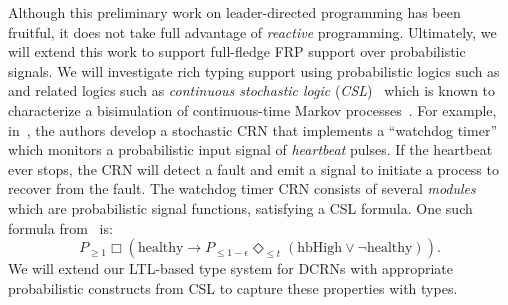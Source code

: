 Although this preliminary work on leader-directed programming has been fruitful, it does not take full advantage of \emph{reactive} programming.
Ultimately, we will extend this work to support full-fledge FRP support over probabilistic signals.
We will investigate rich typing support using probabilistic logics such as and related logics such as \emph{continuous stochastic logic} (\emph{CSL})~\cite{cASSB96} which is known to characterize a bisimulation of continuous-time Markov processes~\cite{DESHARNAIS200399}.
For example, in~\cite{jEKLLLM17}, the authors develop a stochastic CRN that implements a ``watchdog timer'' which monitors a probabilistic input signal of \emph{heartbeat} pulses.
If the heartbeat ever stops, the CRN will detect a fault and emit a signal to initiate a process to recover from the fault.
The watchdog timer CRN consists of several \emph{modules} which are probabilistic signal functions, satisfying a CSL formula.
One such formula from~\cite{jEKLLLM17} is:
\[
    P_{\ge 1}\Box\left(\text{healthy} \rightarrow P_{\le1-\epsilon}\Diamond_{\le t}(\text{hbHigh}\lor\lnot\text{healthy})\right).
\]
We will extend our LTL-based type system for DCRNs with appropriate probabilistic constructs from CSL to capture these properties with types.



